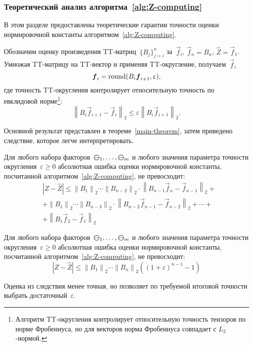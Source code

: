 \subsubsection{Теоретический анализ алгоритма~\ref{alg:Z-computing}}
В этом разделе предоставлены теоретические гарантии точности оценки нормировочной константы алгоритмом~\ref{alg:Z-computing}.

Обозначим оценку произведения TT\hyp{}матриц~$\{B_j\}_{j = i}^n$ за~$\vec{f}_i$, $\vec{f}_n = B_n$, $\widehat{Z} = \vec{f}_1$. Умножая TT\hyp{}матрицу на TT\hyp{}вектор и применяя TT\hyp{}округление, получаем~$\vec{f}_i$
$$
\boldsymbol{f}_i = \operatorname{round}(B_i \boldsymbol{f}_{i + 1}, \upvarepsilon),
$$
где точность TT\hyp{}округления контролирует относительную точность по евклидовой норме\footnote{Алгоритм TT\hyp{}округления контролирует относительную точность тензоров по норме Фробениуса, но для векторов норма Фробениуса совпадает с $L_2$-нормой.}:
\begin{equation}
\label{main-algorithm-rounding-inequality}
\left \| B_i \vec{f}_{i + 1} - \vec{f}_i \right \|_2 \leq \varepsilon \left \| B_i \vec{f}_{i + 1} \right \|_2.
\end{equation}

Основной результат представлен в теореме~\ref{main-theorem}, затем приведено следствие, которое легче интерпретировать.
\begin{theorem}
\label{main-theorem}
	Для любого набора факторов~$\boldsymbol{\mathcal{\Psi}}_1, \ldots, \boldsymbol{\mathcal{\Psi}}_m$ и любого значения параметра точности округления~$\varepsilon \geq 0$ абсолютная ошибка оценки нормировочной константы, посчитанной алгоритмом~\ref{alg:Z-computing}, не превосходит:
	\begin{equation}
	\begin{aligned}
	\label{tough-abs-err-bound}
	&\left |Z - \widehat{Z}  \right | \leq
	\left \| B_1 \right \|_2 \dotsm \left \| B_{n-2} \right \|_2 \cdot \left \| B_{n-1} \vec{f}_n - \vec{f}_{n-1} \right \|_2 + \\
	&+\left \| B_1 \right \|_2 \dotsm \left \| B_{n-3} \right \|_2 \cdot \left \| B_{n-2} \vec{f}_{n-1} - \vec{f}_{n-2} \right \|_2 + \dotsb + \\
	&+\left \| B_1 \vec{f}_2 - \vec{f}_1 \right \|_2
	\end{aligned}
	\end{equation}
\end{theorem}

\begin{corollary}
\label{main-theorem-corollary}
	Для любого набора факторов~$\boldsymbol{\mathcal{\Psi}}_1, \ldots, \boldsymbol{\mathcal{\Psi}}_m$ и любого значения параметра точности округления~$\varepsilon \geq 0$ абсолютная ошибка оценки нормировочной константы, посчитанной алгоритмом~\ref{alg:Z-computing}, не превосходит:
	\begin{equation}
		\label{epsilon-inequality}
		\left |Z - \widehat{Z}\right |  \leq \left \| B_1 \right \|_2 \dotsm \left \| B_n \right \|_2 ((1 + \varepsilon)^{n-1} - 1)
	\end{equation}
\end{corollary}
Оценка из следствия менее точная, но позволяет по требуемой итоговой точности выбрать достаточный~$\varepsilon$.

